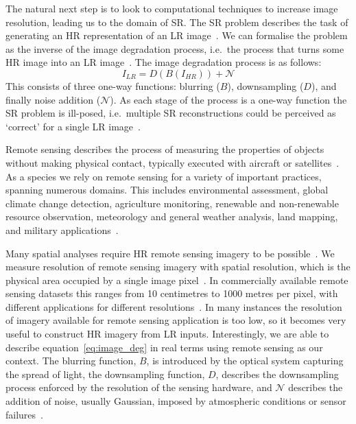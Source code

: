 The natural next step is to look to computational techniques to increase image resolution, leading us to the domain of SR. The SR problem describes the task of generating an HR representation of an LR image~\cite{ref}. We can formalise the problem as the inverse of the image degradation process, i.e.\ the process that turns some HR image into an LR image~\cite{imageDeg}. The image degradation process is as follows:
\begin{equation}\label{eq:image_deg}
    I_{LR} = D(B(I_{HR})) + \mathcal{N}
\end{equation}
This consists of three one-way functions: blurring ($B$), downsampling ($D$), and finally noise addition ($\mathcal{N}$). As each stage of the process is a one-way function the SR problem is ill-posed, i.e.\ multiple SR reconstructions could be perceived as `correct' for a single LR image~\cite{ref}.

Remote sensing describes the process of measuring the properties of objects without making physical contact, typically executed with aircraft or satellites~\cite{remoteSensing,remoteSensingImageProcessing}. As a species we rely on remote sensing for a variety of important practices, spanning numerous domains. This includes environmental assessment, global climate change detection, agriculture monitoring, renewable and non-renewable resource observation, meteorology and general weather analysis, land mapping, and military applications~\cite{remoteSensingImageProcessing, remoteSensingUses, remoteSensingGANsReview}.

Many spatial analyses require HR remote sensing imagery to be possible~\cite{ref}. We measure resolution of remote sensing imagery with spatial resolution, which is the physical area occupied by a single image pixel~\cite{ref}. In commercially available remote sensing datasets this ranges from 10 centimetres to 1000 metres per pixel, with different applications for different resolutions~\cite{remoteSensingImageProcessing}. In many instances the resolution of imagery available for remote sensing application is too low, so it becomes very useful to construct HR imagery from LR inputs. Interestingly, we are able to describe equation~\ref{eq:image_deg} in real terms using remote sensing as our context. The blurring function, $B$, is introduced by the optical system capturing the spread of light, the downsampling function, $D$, describes the downsampling process enforced by the resolution of the sensing hardware, and $\mathcal{N}$ describes the addition of noise, usually Gaussian, imposed by atmospheric conditions or sensor failures~\cite{superResRemoteSensingOverview,superResRemoteSensingChallenges, remoteSensingDeepLearningReview, remoteSensingGANsReview}.

